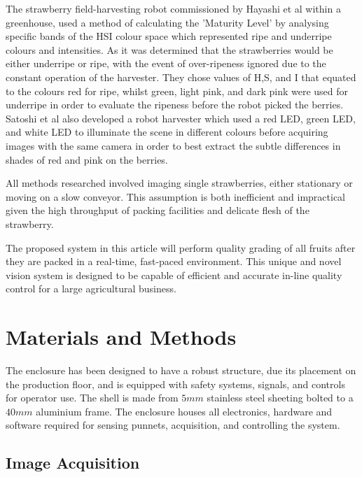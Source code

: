 \documentclass{bmvc2k}
\begin{document}
The strawberry field-harvesting robot commissioned by Hayashi et al \cite{hayashi} within a greenhouse, used a method of calculating the 'Maturity Level' by analysing specific bands of the HSI colour space which represented ripe and underripe colours and intensities. As it was determined that the strawberries would be either underripe or ripe, with the event of over-ripeness ignored due to the constant operation of the harvester. They chose values of H,S, and I that equated to the colours red for ripe, whilst green, light pink, and dark pink were used for underripe in order to evaluate the ripeness before the robot picked the berries. Satoshi et al \cite{satoshi} also developed a robot harvester which used a red LED, green LED, and white LED to illuminate the scene in different colours before acquiring images with the same camera in order to best extract the subtle differences in shades of red and pink on the berries. 

All methods researched involved imaging single strawberries, either stationary or moving on a slow conveyor. This assumption is both inefficient and impractical given the high throughput of packing facilities and delicate flesh of the strawberry.

The proposed system in this article will perform quality grading of all fruits after they are packed in a real-time, fast-paced environment. This unique and novel vision system is designed to be capable of efficient and accurate in-line quality control for a large agricultural business.   





\section{Materials and Methods}


The enclosure has been designed to have a robust structure, due its placement on the production floor, and is equipped with safety systems, signals, and controls for operator use. The shell is made from $5mm$ stainless steel sheeting bolted to a $40mm$ aluminium frame. The enclosure houses all electronics, hardware and software required for sensing punnets, acquisition, and controlling the system.




\subsection{Image Acquisition} 
\end{document}
